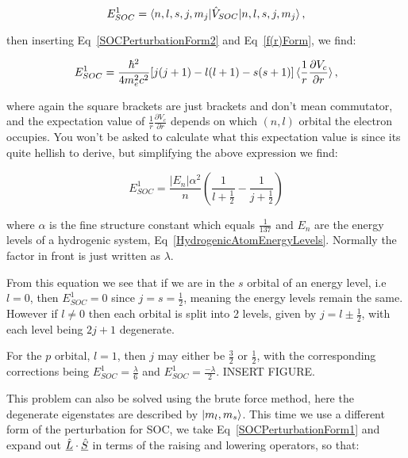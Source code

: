 \begin{equation}
    E^1_{SOC} = \braket{n, l, s, j, m_j | \Hat{V}_{SOC} | n, l, s, j, m_j},
    \label{FirstOrderEnergySOC}
\end{equation}

\noindent then inserting Eq~\ref{SOCPerturbationForm2} and Eq~\ref{f(r)Form}, we find:

\begin{equation}
    E^1_{SOC} = \frac{\hbar^2}{4m^2_ec^2}[j(j + 1) -l(l + 1) - s(s + 1)] \braket{\frac{1}{r}\frac{\partial V_c}{\partial r}},
    \label{FirstOrderEnergySOCForm1}
\end{equation}

\noindent where again the square brackets are just brackets and don't mean commutator, and the expectation value of $\frac{1}{r} \frac{\partial V_c}{\partial r}$ depends on which $(n,l)$ orbital the electron occupies. You won't be asked to calculate what this expectation value is since its quite hellish to derive, but simplifying the above expression we find:

\begin{equation}
    E^1_{SOC} = \frac{|E_n| \alpha^2}{n}(\frac{1}{l + \frac{1}{2}} - \frac{1}{j + \frac{1}{2}})
    \label{FirstOrderEnergySOCForm2}
\end{equation}

\noindent where $\alpha$ is the fine structure constant which equals $\frac{1}{137}$ and $E_n$ are the energy levels of a hydrogenic system, Eq~\ref{HydrogenicAtomEnergyLevels}. Normally the factor in front is just written as $\lambda$.

\noindent From this equation we see that if we are in the $s$ orbital of an energy level, i.e $l = 0$, then $E^1_{SOC} = 0$ since $j = s = \frac{1}{2}$, meaning the energy levels remain the same. However if $l \neq 0$ then each orbital is split into 2 levels, given by $j = l \pm \frac{1}{2}$, with each level being $2j + 1$ degenerate.

\noindent For the $p$ orbital, $l = 1$, then $j$ may either be $\frac{3}{2}$ or $\frac{1}{2}$, with the corresponding corrections being $E^1_{SOC} = \frac{\lambda}{6}$ and $E^1_{SOC} = \frac{-\lambda}{2}$. INSERT FIGURE.

\noindent This problem can also be solved using the brute force method, here the degenerate eigenstates are described by $\ket{m_l, m_s}$. This time we use a different form of the perturbation for SOC, we take Eq~\ref{SOCPerturbationForm1} and expand out $\underline{\Hat{L}} \cdot \underline{\Hat{S}}$ in terms of the raising and lowering operators, so that:

